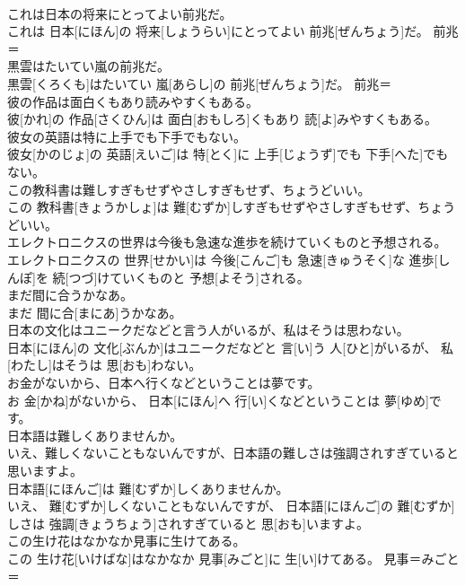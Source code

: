 \documentclass[8pt]{extreport}
\begin{document}
\begin{CJK}{UTF8}{min}
\\	これは日本の将来にとってよい前兆だ。	
\\	これは 日本[にほん]の 将来[しょうらい]にとってよい 前兆[ぜんちょう]だ。	前兆＝ 
\\	黒雲はたいてい嵐の前兆だ。	
\\	黒雲[くろくも]はたいてい 嵐[あらし]の 前兆[ぜんちょう]だ。	前兆＝ 
\\	彼の作品は面白くもあり読みやすくもある。	
\\	彼[かれ]の 作品[さくひん]は 面白[おもしろ]くもあり 読[よ]みやすくもある。	
\\	彼女の英語は特に上手でも下手でもない。	
\\	彼女[かのじょ]の 英語[えいご]は 特[とく]に 上手[じょうず]でも 下手[へた]でもない。	
\\	この教科書は難しすぎもせずやさしすぎもせず、ちょうどいい。	
\\	この 教科書[きょうかしょ]は 難[むずか]しすぎもせずやさしすぎもせず、ちょうどいい。	
\\	エレクトロニクスの世界は今後も急速な進歩を続けていくものと予想される。	
\\	エレクトロニクスの 世界[せかい]は 今後[こんご]も 急速[きゅうそく]な 進歩[しんぽ]を 続[つづ]けていくものと 予想[よそう]される。	
\\	まだ間に合うかなあ。	
\\	まだ 間に合[まにあ]うかなあ。	
\\	日本の文化はユニークだなどと言う人がいるが、私はそうは思わない。	
\\	日本[にほん]の 文化[ぶんか]はユニークだなどと 言[い]う 人[ひと]がいるが、 私[わたし]はそうは 思[おも]わない。	
\\	お金がないから、日本へ行くなどということは夢です。	
\\	お 金[かね]がないから、 日本[にほん]へ 行[い]くなどということは 夢[ゆめ]です。	
\\	日本語は難しくありませんか。 
\\	いえ、難しくないこともないんですが、日本語の難しさは強調されすぎていると思いますよ。	
\\	日本語[にほんご]は 難[むずか]しくありませんか。 
\\	いえ、 難[むずか]しくないこともないんですが、 日本語[にほんご]の 難[むずか]しさは 強調[きょうちょう]されすぎていると 思[おも]いますよ。	
\\	この生け花はなかなか見事に生けてある。	
\\	この 生け花[いけばな]はなかなか 見事[みごと]に 生[い]けてある。	見事＝みごと＝ 

\end{CJK}
\end{document}
